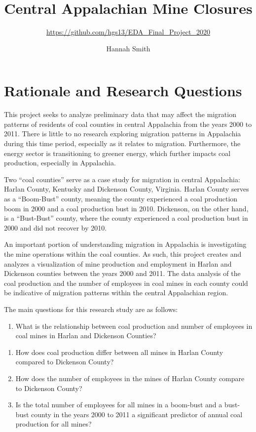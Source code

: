 \documentclass[12pt,]{article}
\title{Central Appalachian Mine Closures}
\subtitle{\url{https://github.com/hgs13/EDA_Final_Project_2020}}
\author{Hannah Smith}
\date{}
\providecommand{\tightlist}{%
  \setlength{\itemsep}{0pt}\setlength{\parskip}{0pt}}
\begin{document}
\maketitle

\newpage
\tableofcontents 
\newpage
\listoftables 
\newpage
\listoffigures 
\newpage

\hypertarget{rationale-and-research-questions}{%
\section{Rationale and Research
Questions}\label{rationale-and-research-questions}}

This project seeks to analyze preliminary data that may affect the
migration patterns of residents of coal counties in central Appalachia
from the years 2000 to 2011. There is little to no research exploring
migration patterns in Appalachia during this time period, especially as
it relates to migration. Furthermore, the energy sector is transitioning
to greener energy, which further impacts coal production, especially in
Appalachia.

Two ``coal counties'' serve as a case study for migration in central
Appalachia: Harlan County, Kentucky and Dickenson County, Virginia.
Harlan County serves as a ``Boom-Bust'' county, meaning the county
experienced a coal production boom in 2000 and a coal production bust in
2010. Dickenson, on the other hand, is a ``Bust-Bust'' county, where the
county experienced a coal production bust in 2000 and did not recover by
2010.

An important portion of understanding migration in Appalachia is
investigating the mine operations within the coal counties. As such,
this project creates and analyzes a visualization of mine production and
employment in Harlan and Dickenson counties between the years 2000 and
2011. The data analysis of the coal production and the number of
employees in coal mines in each county could be indicative of migration
patterns within the central Appalachian region.

The main questions for this research study are as follows:

\begin{enumerate}
\def\labelenumi{\arabic{enumi}.}
\tightlist
\item
  What is the relationship between coal production and number of
  employees in coal mines in Harlan and Dickenson Counties?
\end{enumerate}

\begin{enumerate}
\def\labelenumi{\alph{enumi}.}
\item
  How does coal production differ between all mines in Harlan County
  compared to Dickenson County?
\item
  How does the number of employees in the mines of Harlan County compare
  to Dickenson County?
\item
  Is the total number of employees for all mines in a boom-bust and a
  bust-bust county in the years 2000 to 2011 a significant predictor of
  annual coal production for all mines?
\end{enumerate}
\end{document}

